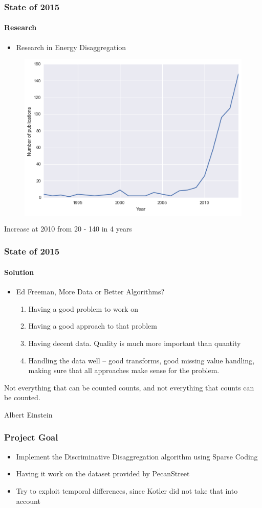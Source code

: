 \documentclass{beamer}              %
\begin{document}
\begin{frame}
	\frametitle{State of 2015}
	\framesubtitle{Research}
	\begin{itemize}
		\item{Research in Energy Disaggregation}
	\end{itemize}
	\begin{figure}[!ht]
		\colorbox{white}{\includegraphics[scale=0.40]{./figures/growth}}
	\end{figure}
		Increase at 2010 from 20 - 140 in 4 years
\end{frame}

\begin{frame}
	\frametitle{State of 2015}
	\framesubtitle{Solution}
	\begin{itemize}
		\item{Ed Freeman, More Data or Better Algorithms?}
		\begin{enumerate}
			\item{Having a good problem to work on}
			\item{Having a good approach to that problem}
			\item{Having decent data. Quality is much more important than quantity}
			\item{Handling the data well -- good transforms, good missing value handling, making sure that all approaches make sense for the problem.}
		\end{enumerate}
	\end{itemize}
	\epigraph{Not everything that can be counted counts, and not everything that counts can be counted.}{Albert Einstein}
\end{frame}
\begin{frame}
	\frametitle{Project Goal}
		\begin{itemize}
			\item{Implement the Discriminative Disaggregation algorithm using Sparse Coding}
			\item{Having it work on the dataset provided by PecanStreet}
			\item{Try to exploit temporal differences, since Kotler did not take that into account}
		\end{itemize}
\end{frame}
\end{document}
